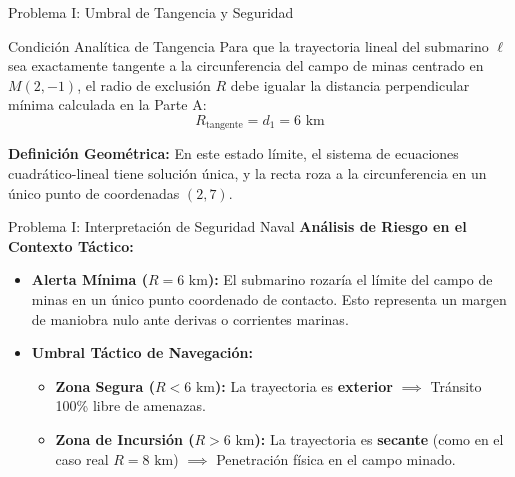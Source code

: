 \documentclass[aspectratio=169]{beamer}
\begin{document}
\begin{frame}{Problema I: Umbral de Tangencia y Seguridad}
  \begin{block}{Condición Analítica de Tangencia}
    Para que la trayectoria lineal del submarino $\ell$ sea exactamente tangente a la circunferencia del campo de minas centrado en $M(2, -1)$, el radio de exclusión $R$ debe igualar la distancia perpendicular mínima calculada en la Parte A:
    \[R_{\text{tangente}} = d_1 = 6\text{~km}\]
  \end{block}
  \vspace{0.4cm}
  \centering
  \small \textcolor{USSBlue}{\textbf{Definición Geométrica:} En este estado límite, el sistema de ecuaciones cuadrático-lineal tiene solución única, y la recta roza a la circunferencia en un único punto de coordenadas $(2, 7)$.}
\end{frame}

\begin{frame}{Problema I: Interpretación de Seguridad Naval}
  \textbf{Análisis de Riesgo en el Contexto Táctico:}
  \vspace{0.3cm}
  \begin{itemize}
    \item \textbf{Alerta Mínima ($R = 6\text{~km}$):} 
      El submarino rozaría el límite del campo de minas en un único punto coordenado de contacto. Esto representa un margen de maniobra nulo ante derivas o corrientes marinas.
    \vspace{0.2cm}
    \item \textbf{Umbral Táctico de Navegación:}
      \begin{itemize}
        \item \textbf{Zona Segura ($R < 6\text{~km}$):} La trayectoria es \textbf{exterior} $\implies$ Tránsito 100\% libre de amenazas.
        \item \textbf{Zona de Incursión ($R > 6\text{~km}$):} La trayectoria es \textbf{secante} (como en el caso real $R = 8\text{~km}$) $\implies$ Penetración física en el campo minado.
      \end{itemize}
  \end{itemize}
\end{frame}
\end{document}
